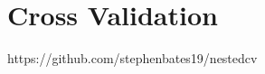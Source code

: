 \documentclass[../../main.tex]{subfiles}
\begin{document}

\section{Cross Validation}


https://github.com/stephenbates19/nestedcv

\end{document}
